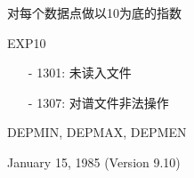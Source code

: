 \label{cmd:exp10}

对每个数据点做以10为底的指数

EXP10

\begin{itemize}
\item[-]1301: 未读入文件
\item[-]1307: 对谱文件非法操作
\end{itemize}

DEPMIN, DEPMAX, DEPMEN

January 15, 1985 (Version 9.10)
